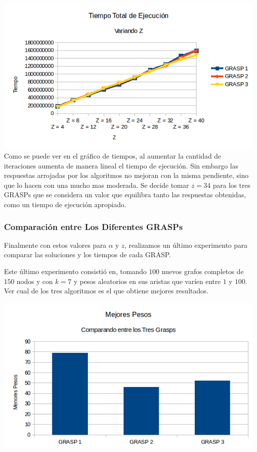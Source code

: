 \includegraphics[scale=0.7]{Ej5/tiemposZ.png}\\

Como se puede ver en el gráfico de tiempos, al aumentar la cantidad de iteraciones aumenta de manera lineal el tiempo de ejecución. Sin embargo las respuestas arrojadas por los algoritmos no mejoran con la misma pendiente, sino que lo hacen con una mucho mas moderada. Se decide tomar $z = 34$ para los tres GRASPs que se considera un valor que equilibra tanto las respuestas obtenidas, como un tiempo de ejecución apropiado. 

\subsubsection{Comparación entre Los Diferentes GRASPs}

Finalmente con estos valores para $\alpha$ y $z$, realizamos un último experimento para comparar las soluciones y los tiempos de cada GRASP.

Este último experimento consistió en, tomando $100$ nuevos grafos completos de $150$ nodos y con $k = 7$ y pesos aleatorios en sus aristas que varíen entre $1$ y $100$. Ver cual de los tres algoritmos es el que obtiene mejores resultados.

\includegraphics[scale=0.7]{Ej5/CompetenciaGRASPs1.png}\\

